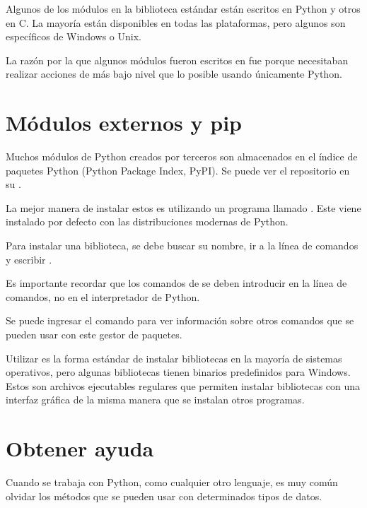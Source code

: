 Algunos de los módulos en la biblioteca estándar están escritos en Python y otros en C.
La mayoría están disponibles en todas las plataformas, pero algunos son específicos de Windows o Unix.

La razón por la que algunos módulos fueron escritos en  fue porque necesitaban realizar acciones de más bajo nivel que lo posible usando únicamente Python.

\section{Módulos externos y pip}

Muchos módulos de Python creados por terceros son almacenados en el índice de paquetes Python (Python Package Index, PyPI).
Se puede ver el repositorio en su .

La mejor manera de instalar estos es utilizando un programa llamado .
Este viene instalado por defecto con las distribuciones modernas de Python.

Para instalar una biblioteca, se debe buscar su nombre, ir a la línea de comandos y escribir .


Es importante recordar que los comandos de  se deben introducir en la línea de comandos, no en el interpretador de Python.

Se puede ingresar el comando  para ver información sobre otros comandos que se pueden usar con este gestor de paquetes.


Utilizar  es la forma estándar de instalar bibliotecas en la mayoría de sistemas operativos, pero algunas bibliotecas tienen binarios predefinidos para Windows.
Estos son archivos ejecutables regulares que permiten instalar bibliotecas con una interfaz gráfica de la misma manera que se instalan otros programas.

\section{Obtener ayuda}

Cuando se trabaja con Python, como cualquier otro lenguaje, es muy común olvidar los métodos que se pueden usar con determinados tipos de datos.

